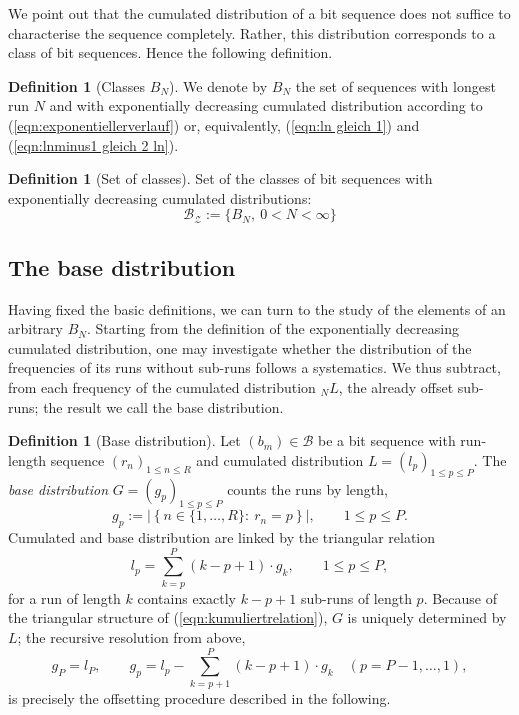 \documentclass[11pt,a4paper]{scrartcl}
\theoremstyle{plain}
\theoremstyle{definition}
\newtheorem{defi}[satz]{Definition}
\theoremstyle{remark}
\begin{document}
\noindent We point out that the cumulated distribution of a bit
sequence does not suffice to characterise the sequence completely.
Rather, this distribution corresponds to a class of bit sequences.
Hence the following definition.

\begin{defi}[Classes $B_N$]\label{defi:bn}
We denote by $B_N$ the set of sequences with longest run $N$ and with
exponentially decreasing cumulated distribution according to
(\ref{eqn:exponentiellerverlauf}) or, equivalently,
(\ref{eqn:ln gleich 1}) and (\ref{eqn:lnminus1 gleich 2 ln}).
\end{defi}

\begin{defi}[Set of classes]\label{defi:bz}
Set of the classes of bit sequences with exponentially decreasing
cumulated distributions:
\begin{equation}\label{eqn:mengederklassen}
  \mathcal{B_Z} := \{B_N,\ 0< N<\infty \}
\end{equation}
\end{defi}

\subsection{The base distribution}

Having fixed the basic definitions, we can turn to the study of the
elements of an arbitrary $B_N$. Starting from the definition of the
exponentially decreasing cumulated distribution, one may investigate
whether the distribution of the frequencies of its runs without
sub-runs follows a systematics. We thus subtract, from each frequency
of the cumulated distribution $_NL$, the already offset sub-runs;
the result we call the base distribution.

\begin{defi}[Base distribution]\label{defi:grundverteilung}
Let $(b_m)\in\mathcal B$ be a bit sequence with run-length sequence
$(r_n)_{1\leq n\leq R}$ and cumulated distribution $L=(l_p)_{1\leq
p\leq P}$. The \emph{base distribution} $G=(g_p)_{1\leq p\leq P}$
counts the runs by length,
\begin{equation}\label{eqn:grunddef}
  g_p:=\left|\left\{n\in\{1,\dots,R\}:\ r_n=p\right\}\right|,\qquad 1\leq p\leq P.
\end{equation}
Cumulated and base distribution are linked by the triangular
relation
\begin{equation}\label{eqn:kumuliertrelation}
  l_p=\sum_{k=p}^{P}\left(k-p+1\right)\cdot g_k,\qquad 1\leq p\leq P,
\end{equation}
for a run of length $k$ contains exactly $k-p+1$ sub-runs of length
$p$. Because of the triangular structure of
(\ref{eqn:kumuliertrelation}), $G$ is uniquely determined by $L$;
the recursive resolution from above,
\begin{equation}\label{eqn:abgeltungrekursiv}
  g_P=l_P,\qquad
  g_p=l_p-\sum_{k=p+1}^{P}\left(k-p+1\right)\cdot g_k
  \quad(p=P-1,\dots,1),
\end{equation}
is precisely the offsetting procedure described in the following.
\end{defi}
\end{document}

